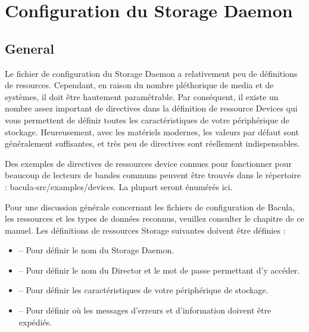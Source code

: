 
\chapter{Configuration du Storage Daemon}
\label{_ChapterStart31}

\section{General}
Le fichier de configuration du Storage Daemon a relativement peu de d\'efinitions 
de resources. Cependant, en raison du nombre pl\'ethorique de media et de syst\`emes, 
il doit \^etre hautement param\'etrable. Par cons\'equent, il existe un nombre assez important 
de directives dans la d\'efinition de ressource Devices qui vous permettent de d\'efinir 
toutes les caract\'eristiques de votre p\'eriph\'erique de stockage. Heureusement, avec les 
mat\'eriels modernes, les valeurs par d\'efaut sont g\'en\'eralement suffisantes, et tr\`es 
peu de directives sont r\'eellement indispensables.

Des exemples de directives de ressources device connues pour fonctionner pour 
beaucoup de lecteurs de bandes communs peuvent \^etre trouv\'es dans le r\'epertoire : 
\lt{}bacula-src\gt{}/examples/devices. La plupart seront \'enum\'er\'es ici.

Pour une discussion g\'en\'erale concernant les fichiers de configuration de Bacula, 
les ressources et les types de donn\'ees reconnus, veuillez consulter le 
chapitre  de ce manuel. Les d\'efinitions de 
ressources Storage suivantes doivent \^etre d\'efinies :

\begin{itemize}
\item 
    -- Pour d\'efinir le nom du Storage Daemon.
\item 
    -- Pour d\'efinir le nom du Director et le mot 
   de passe permettant d'y acc\'eder.
\item 
    -- Pour d\'efinir les caract\'eristiques de votre 
   p\'eriph\'erique de stockage.
\item 
    -- Pour d\'efinir o\`u les messages d'erreurs 
   et d'information doivent \^etre exp\'edi\'es.
\end{itemize}

